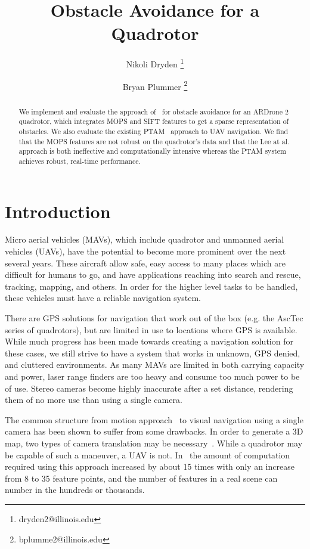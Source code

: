 \documentclass{acmsiggraph}
\title{Obstacle Avoidance for a Quadrotor}
\author{Nikoli Dryden \thanks{dryden2@illinois.edu} %
\and Bryan Plummer \thanks{bplumme2@illinois.edu}}
\begin{document}
\maketitle

\begin{abstract}
We implement and evaluate the approach of~\cite{lee2011} for obstacle avoidance for an ARDrone 2 quadrotor, which integrates MOPS and SIFT features to get a sparse representation of obstacles. We also evaluate the existing PTAM~\cite{klein07parallel} approach to UAV navigation. We find that the MOPS features are not robust on the quadrotor's data and that the Lee at al. approach is both ineffective and computationally intensive whereas the PTAM system achieves robust, real-time performance.
\end{abstract}

\section{Introduction}
Micro aerial vehicles (MAVs), which include quadrotor and unmanned aerial vehicles (UAVs), have the potential to become more 
prominent over the next several years.  These aircraft allow safe, easy access to many places which are difficult for humans to go, and have applications reaching into search and rescue, tracking, mapping, and others.
In order for the higher level tasks to be handled, these vehicles must have a reliable 
navigation system.

There are GPS solutions for navigation that work out of the box (e.g. the AscTec series of quadrotors), but are limited in use
to locations where GPS is available.  While much progress has been made towards creating a navigation solution
for these cases, we still strive to have a system that works in unknown, GPS denied, and cluttered environments.  As many 
MAVs are limited in both carrying capacity and power, laser range finders are too heavy and consume too much power to be of 
use. Stereo cameras become highly inaccurate after a set distance, rendering them of no more use than using a single camera.

The common structure from motion approach~\cite{dellaert2000} to visual navigation using a single camera has been shown to suffer from some 
drawbacks.  In order to generate a 3D map, two types of camera translation may be necessary~\cite{shah2010}.  While
a quadrotor may be capable of such a maneuver, a UAV is not.  In~\cite{shah2009} the amount of computation required using this 
approach increased by about 15 times with only an increase from 8 to 35 feature points, and the number of features in a real
scene can number in the hundreds or thousands.
\end{document}
